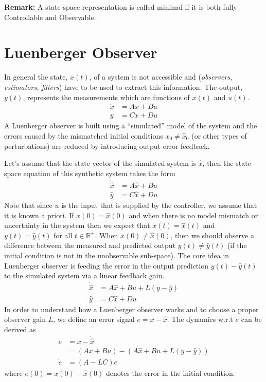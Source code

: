 \documentclass[twoside]{article}
\begin{document}
\textbf{Remark:} A state-space representation is called minimal 
if it is both fully Controllable and Observable. 


\section{Luenberger Observer}

In general the state, $x(t)$, of a system
is not accessible and (\textit{observers, estimators, filters})
have to be used to extract this information.
The output, $y(t)$, represents the measurements
which are functions of $x(t)$ and $u(t)$.
%
\begin{align*}
  \dot{x} &= A x + B u
  \\
  y &= C x + D u
\end{align*}
%
A Luenberger observer is built using a ``simulated'' model of the 
system and the errors caused by the mismatched initial conditions 
$x_0 \neq \hat{x}_0$ (or other types of perturbations)
are reduced by introducing output error feedback.

Let's assume that the state vector of the simulated system
is $\hat{x}$, then the state space equation of this
synthetic system takes the form
%
\begin{align*}
  \dot{\hat{x}} &= A \hat{x} + B u
  \\
  \hat{y} &= C \hat{x} + D u
\end{align*}
%
Note that since $u$ is the input that is supplied by the 
controller, we assume that it is known a priori. If $x(0) = \hat{x}(0)$ and
when there is no model mismatch or uncertainty in the system
then we expect that $x(t) = \hat{x}(t)$ and $y(t) = \hat{y}(t)$ 
for all $t \in \mathbb{R}^+$. When $x(0) \neq \hat{x}(0)$, then we should observe a 
difference between the measured and predicted output
$y(t) \neq \hat{y}(t)$ (if the initial condition is not in the 
unobservable sub-space). The core idea in Luenberger observer
is feeding the error in the output prediction 
$y(t) - \hat{y}(t)$ to the simulated system via a linear feedback gain.
%
\begin{align*}
  \dot{\hat{x}} &= A \hat{x} + B u + L \left( y - \hat{y} \right) 
  \\
  \hat{y} &= C \hat{x} + D u
\end{align*}
%
In order to understand how a Luenberger observer works and
to choose a proper observer gain $L$, we define an error signal
$e = x - \hat{x}$. The dynamics w.r.t $e$ can be derived
as
%
\begin{align*}
  \dot{e} &= \dot{x} - \dot{\hat{x}}
        \\
     &= \left( A x + B u \right)
  - \left( A \hat{x} + B u + L \left( y - \hat{y} \right)
       \right)
\\
   \dot{e} &= \left( A - L C \right) e
\end{align*}
%
where $e(0) = x(0) - \hat{x}(0)$ denotes the error in the initial
condition. 
\end{document}
